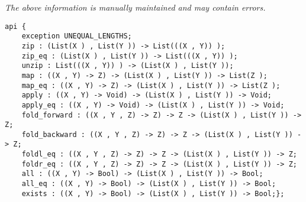 \label{api:Paired\_Lists}

{\tiny \it The above information is manually maintained and may contain errors.}
\begin{verbatim}
api {
    exception UNEQUAL_LENGTHS;
    zip : (List(X ) , List(Y )) -> List(((X , Y)) );
    zip_eq : (List(X ) , List(Y )) -> List(((X , Y)) );
    unzip : List(((X , Y)) ) -> (List(X ) , List(Y ));
    map : ((X , Y) -> Z) -> (List(X ) , List(Y )) -> List(Z );
    map_eq : ((X , Y) -> Z) -> (List(X ) , List(Y )) -> List(Z );
    apply : ((X , Y) -> Void) -> (List(X ) , List(Y )) -> Void;
    apply_eq : ((X , Y) -> Void) -> (List(X ) , List(Y )) -> Void;
    fold_forward : ((X , Y , Z) -> Z) -> Z -> (List(X ) , List(Y )) -> Z;
    fold_backward : ((X , Y , Z) -> Z) -> Z -> (List(X ) , List(Y )) -> Z;
    foldl_eq : ((X , Y , Z) -> Z) -> Z -> (List(X ) , List(Y )) -> Z;
    foldr_eq : ((X , Y , Z) -> Z) -> Z -> (List(X ) , List(Y )) -> Z;
    all : ((X , Y) -> Bool) -> (List(X ) , List(Y )) -> Bool;
    all_eq : ((X , Y) -> Bool) -> (List(X ) , List(Y )) -> Bool;
    exists : ((X , Y) -> Bool) -> (List(X ) , List(Y )) -> Bool;};
\end{verbatim}

